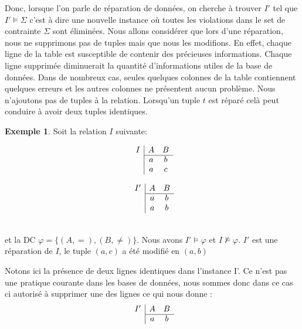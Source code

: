 \documentclass[letterpaper, 12pt]{report}
\theoremstyle{definition}
\newtheorem{myexample}{Exemple}
\begin{document}
Donc, lorsque l'on parle de réparation de données, on cherche à trouver $I'$ tel que $I' \models \Sigma$ c'est à dire une nouvelle instance où toutes les violations dans le set de contrainte $\Sigma$ sont éliminées. Nous allons considérer que lors d'une réparation, nous ne supprimons pas de tuples mais que nous les modifions. En effet, chaque ligne de la table est susceptible de contenir des précieuses informations. Chaque ligne supprimée diminuerait la quantité d'informations utiles de la base de données. Dans de nombreux cas, seules quelques colonnes de la table contiennent quelques erreurs et les autres colonnes ne présentent aucun problème.  Nous n'ajoutons pas de tuples à la relation. Lorsqu'un tuple $t$ est réparé celà peut conduire à avoir deux tuples identiques. \\

\begin{myexample}
	Soit la relation $I$ suivante:\\
	\begin{minipage}{.45\textwidth}\centering
		$$
		\begin{array}{c|cc}
		I & A & B\\\cline{2-3}
 		 & a & b\\
 		 & a & c
		\end{array}  
		$$
	\end{minipage}
	\begin{minipage}{.45\textwidth}\centering
		$$
		\begin{array}{c|cc}
		I' & A & B\\\cline{2-3}
 		 & a & b\\
 		 & a & b
		\end{array}  
		$$
	\end{minipage}~\\
et la DC $\varphi = \{ (A,=),(B,\neq)\}$. Nous avons $I' \models \varphi$ et $I \not\models \varphi$. $I'$ est une réparation de $I$, le tuple $(a,c)$ a été modifié en $(a,b)$

Notons ici la présence de deux lignes identiques dans l'instance I'. Ce n'est pas une pratique courante dans les bases de données, nous sommes donc dans ce cas ci autorisé à supprimer une des lignes ce qui nous donne :\\
$$
		\begin{array}{c|cc}
		I' & A & B\\\cline{2-3}
 		 & a & b
		\end{array}  
		$$
\end{myexample}
\end{document}
